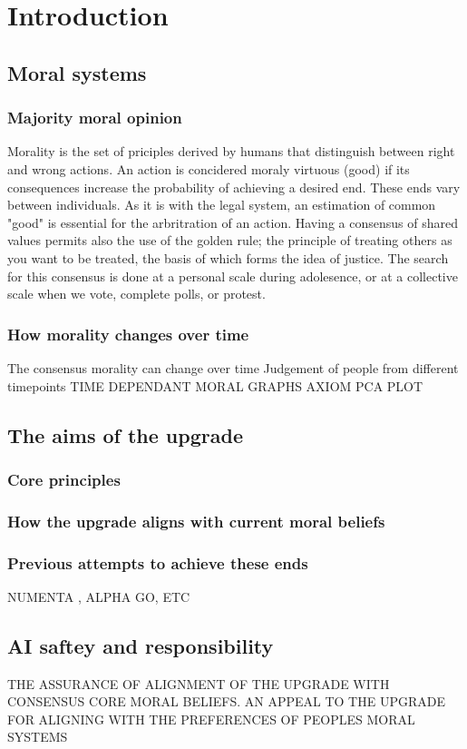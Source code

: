 \chapter{Introduction}
\section{Moral systems}
\subsection{Majority moral opinion}
Morality is the set of priciples derived by humans that distinguish between right and wrong actions. An action is concidered moraly virtuous (good) if its consequences increase the probability of achieving a desired end. These ends vary between individuals. As it is with the legal system, an estimation of common "good" is essential for the arbritration of an action. Having a consensus of shared values permits also the use of the golden rule; the principle of treating others as you want to be treated, the basis of which forms the idea of justice. The search for this consensus is done at a personal scale during adolesence, or at a collective scale when we vote, complete polls, or protest.

\subsection{How morality changes over time}
The consensus morality can change over time
Judgement of people from different timepoints
TIME DEPENDANT MORAL GRAPHS
AXIOM PCA PLOT

\section{The aims of the upgrade}
\subsection{Core principles}
\subsection{How the upgrade aligns with current moral beliefs}
\subsection{Previous attempts to achieve these ends}
NUMENTA \cite{numentahome}, ALPHA GO, ETC
\section{AI saftey and responsibility}
THE ASSURANCE OF ALIGNMENT OF THE UPGRADE WITH CONSENSUS CORE MORAL BELIEFS.
AN APPEAL TO THE UPGRADE FOR ALIGNING WITH THE PREFERENCES OF PEOPLES MORAL SYSTEMS
